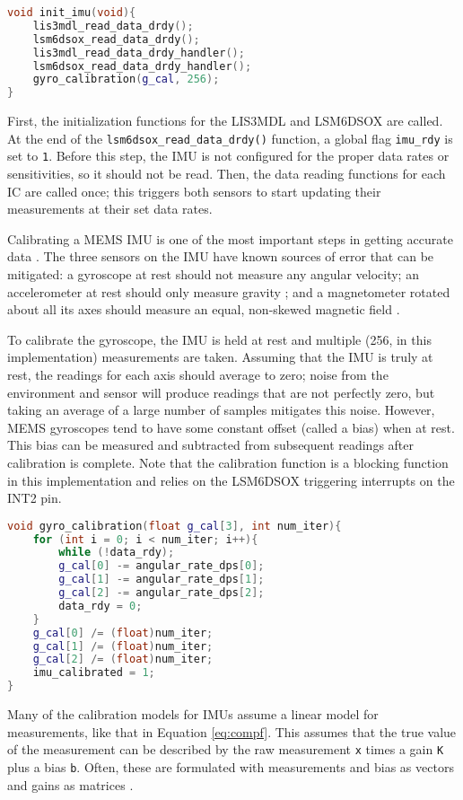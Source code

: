 \documentclass[11pt]{ucthesisCP}
\begin{document}
\begin{lstlisting}[language=C++]
void init_imu(void){
	lis3mdl_read_data_drdy();
	lsm6dsox_read_data_drdy();
	lis3mdl_read_data_drdy_handler();
	lsm6dsox_read_data_drdy_handler();
	gyro_calibration(g_cal, 256);
}
\end{lstlisting}

First, the initialization functions for the LIS3MDL and LSM6DSOX are called. At the end of the \verb|lsm6dsox_read_data_drdy()| function, a global flag \verb|imu_rdy| is set to \verb|1|. Before this step, the IMU is not configured for the proper data rates or sensitivities, so it should not be read. Then, the data reading functions for each IC are called once; this triggers both sensors to start updating their measurements at their set data rates.

Calibrating a MEMS IMU is one of the most important steps in getting accurate data \cite{imuadvnav}. The three sensors on the IMU have known sources of error that can be mitigated: a gyroscope at rest should not measure any angular velocity; an accelerometer at rest should only measure gravity \cite{imucal}; and a magnetometer rotated about all its axes should measure an equal, non-skewed magnetic field \cite{magcal}.

To calibrate the gyroscope, the IMU is held at rest and multiple (256, in this implementation) measurements are taken. Assuming that the IMU is truly at rest, the readings for each axis should average to zero; noise from the environment and sensor will produce readings that are not perfectly zero, but taking an average of a large number of samples mitigates this noise. However, MEMS gyroscopes tend to have some constant offset (called a bias) when at rest. This bias can be measured and subtracted from subsequent readings after calibration is complete. Note that the calibration function is a blocking function in this implementation and relies on the LSM6DSOX triggering interrupts on the INT2 pin.

\begin{lstlisting}[language=C++]
void gyro_calibration(float g_cal[3], int num_iter){
	for (int i = 0; i < num_iter; i++){
		while (!data_rdy);
		g_cal[0] -= angular_rate_dps[0];
		g_cal[1] -= angular_rate_dps[1];
		g_cal[2] -= angular_rate_dps[2];
		data_rdy = 0;
	}
	g_cal[0] /= (float)num_iter;
	g_cal[1] /= (float)num_iter;
	g_cal[2] /= (float)num_iter;
	imu_calibrated = 1;
}
\end{lstlisting}

Many of the calibration models for IMUs assume a linear model for measurements, like that in Equation \ref{eq:compf}. This assumes that the true value of the measurement can be described by the raw measurement \verb|x| times a gain \verb|K| plus a bias \verb|b|. Often, these are formulated with measurements and bias as vectors and gains as matrices \cite{imucal}.
\end{document}
